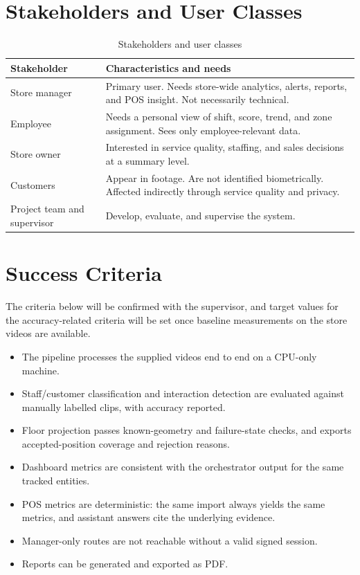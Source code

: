 \section{Stakeholders and User Classes}
\begin{table}[H]
\centering
\caption{Stakeholders and user classes}
\begin{tabular}{P{0.2\textwidth}P{0.7\textwidth}}
\toprule
Stakeholder & Characteristics and needs\\
\midrule
Store manager & Primary user. Needs store-wide analytics, alerts, reports, and POS insight. Not necessarily technical.\\
Employee & Needs a personal view of shift, score, trend, and zone assignment. Sees only employee-relevant data.\\
Store owner & Interested in service quality, staffing, and sales decisions at a summary level.\\
Customers & Appear in footage. Are not identified biometrically. Affected indirectly through service quality and privacy.\\
Project team and supervisor & Develop, evaluate, and supervise the system.\\
\bottomrule
\end{tabular}
\end{table}

\section{Success Criteria}
The criteria below will be confirmed with the supervisor, and target values for the accuracy-related criteria will be set once baseline measurements on the store videos are available.
\begin{itemize}
\item The pipeline processes the supplied videos end to end on a CPU-only machine.
\item Staff/customer classification and interaction detection are evaluated against manually labelled clips, with accuracy reported. 
\item Floor projection passes known-geometry and failure-state checks, and exports accepted-position coverage and rejection reasons.

\item Dashboard metrics are consistent with the orchestrator output for the same tracked entities.
\item POS metrics are deterministic: the same import always yields the same metrics, and assistant answers cite the underlying evidence.
\item Manager-only routes are not reachable without a valid signed session.
\item Reports can be generated and exported as PDF.
\end{itemize}

